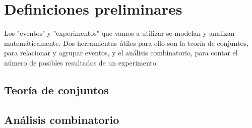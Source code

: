 \chapter{Definiciones preliminares}

Los "eventos" y "experimentos" que vamos a utilizar se modelan y analizan matemáticamente. Dos herramientas útiles para ello son la teoría de conjuntos, para relacionar y agrupar eventos, y el análisis combinatorio, para contar el número de posibles resultados de un experimento.

\section{Teoría de conjuntos}

\lipsum[1]


\section{Análisis combinatorio}

